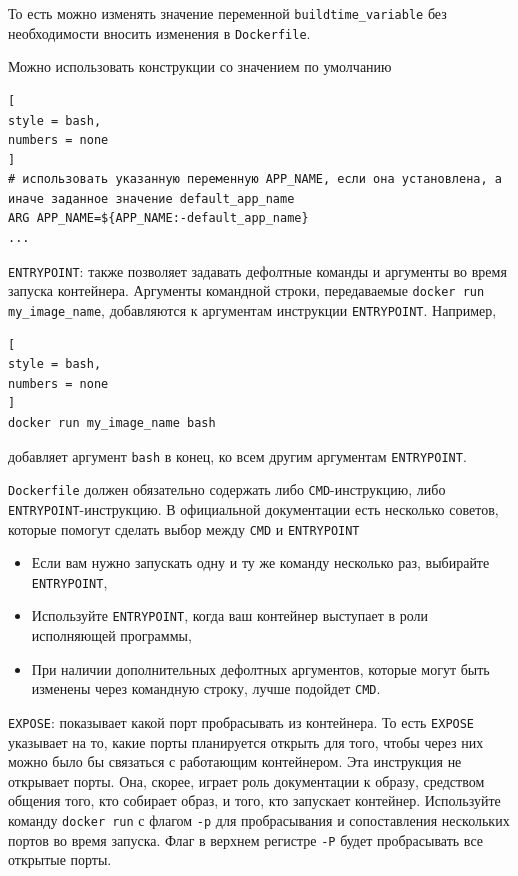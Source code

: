 \documentclass[%
	11pt,
	a4paper,
	utf8,
		]{article}
\begin{document}
То есть можно изменять значение переменной \verb|buildtime_variable| без необходимости вносить изменения в \texttt{Dockerfile}.

Можно использовать конструкции со значением по умолчанию
\begin{lstlisting}[
style = bash,
numbers = none
]
# использовать указанную переменную APP_NAME, если она установлена, а иначе заданное значение default_app_name
ARG APP_NAME=${APP_NAME:-default_app_name}
...
\end{lstlisting}

\texttt{ENTRYPOINT}: также позволяет задавать дефолтные команды и аргументы во время запуска контейнера. Аргументы командной строки, передаваемые \texttt{docker run my\_image\_name}, добавляются к аргументам инструкции \texttt{ENTRYPOINT}. Например,
\begin{lstlisting}[
style = bash,
numbers = none	
]
docker run my_image_name bash
\end{lstlisting}
добавляет аргумент \texttt{bash} в конец, ко всем другим аргументам \texttt{ENTRYPOINT}.

\texttt{Dockerfile} должен обязательно содержать либо \texttt{CMD}-инструкцию, либо \texttt{ENTRYPOINT}-инструкцию. В официальной документации есть несколько советов, которые помогут сделать выбор между \texttt{CMD} и \texttt{ENTRYPOINT}
\begin{itemize}
	\item Если вам нужно запускать одну и ту же команду несколько раз, выбирайте \texttt{ENTRYPOINT},
	
	\item Используйте \texttt{ENTRYPOINT}, когда ваш контейнер выступает в роли исполняющей программы,
	
	\item При наличии дополнительных дефолтных аргументов, которые могут быть изменены через командную строку, лучше подойдет \texttt{CMD}.
\end{itemize}

\texttt{EXPOSE}: показывает какой порт пробрасывать из контейнера. То есть \verb*|EXPOSE| указывает на то, какие порты планируется открыть для того, чтобы через них можно было бы связаться с работающим контейнером. Эта инструкция не открывает порты. Она, скорее, играет роль документации к образу, средством общения того, кто собирает образ, и того, кто запускает контейнер. Используйте команду \texttt{docker run} с флагом \verb|-p| для пробрасывания и сопоставления нескольких портов во время запуска. Флаг в верхнем регистре \verb|-P| будет пробрасывать все открытые порты.
\end{document}
